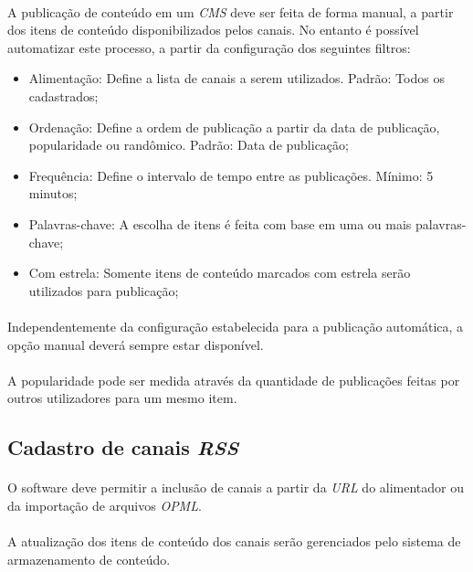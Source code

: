 \documentclass[a4paper,12pt]{article}
\def\cms{\emph{CMS}}
\def\rss{\emph{RSS}}
\begin{document}
\paragraph{}
A publicação de conteúdo em um \cms{} deve ser feita de forma manual, a partir dos itens de conteúdo disponibilizados pelos canais. No entanto é possível automatizar este processo, a partir da configuração dos seguintes filtros:

\begin{itemize}
\item Alimentação: Define a lista de canais a serem utilizados. Padrão: Todos os cadastrados;
\item Ordenação: Define a ordem de publicação a partir da data de publicação, popularidade ou randômico. Padrão: Data de publicação;
\item Frequência: Define o intervalo de tempo entre as publicações. Mínimo: 5 minutos;
\item Palavras-chave: A escolha de itens é feita com base em uma ou mais palavras-chave;
\item Com estrela: Somente itens de conteúdo marcados com estrela serão utilizados para publicação;
\end{itemize}

\paragraph{}
Independentemente da configuração estabelecida para a publicação automática, a opção manual deverá sempre estar disponível.

\paragraph{}
A popularidade pode ser medida através da quantidade de publicações feitas por outros utilizadores para um mesmo item.

\subsection{Cadastro de canais \rss{}}

\paragraph{}
O software deve permitir a inclusão de canais a partir da \emph{URL} do alimentador ou da importação de arquivos \emph{OPML}.
\paragraph{}
A atualização dos itens de conteúdo dos canais serão gerenciados pelo sistema de armazenamento de conteúdo.
\end{document}
